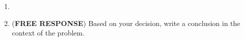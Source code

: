 \begin{enumerate}
\begin{enumerate}
      \begin{itemize}
      \item Reject the null hypothesis because the $p$-value $\leq$ $\alpha$.
      \item Reject the null hypothesis because the $p$-value $>$ $\alpha$.
      \item Fail to reject the null hypothesis because the $p$-value $\leq$ $\alpha$.
      \item Fail to reject the null hypothesis because the $p$-value $>$ $\alpha$.
      \end{itemize}
\item[]
    \item (\textbf{FREE RESPONSE})  Based on your decision, write a conclusion in the context of the problem.
    \end{enumerate}
  \end{enumerate}